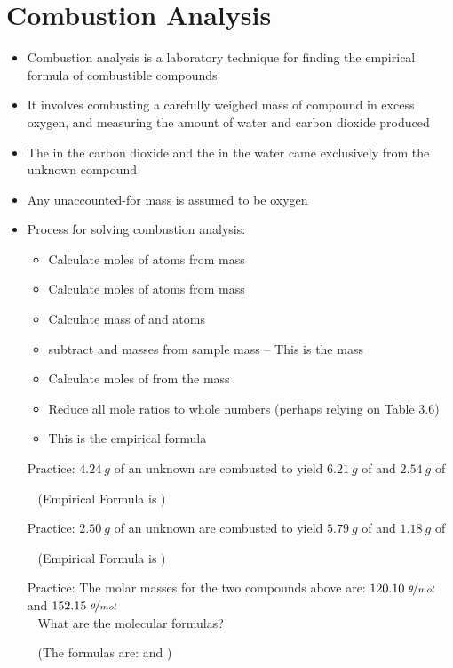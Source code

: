 \documentclass[12pt, openany, letterpaper]{memoir}
\begin{document}
\section{Combustion Analysis}
\begin{itemize}
	\item Combustion analysis is a laboratory technique for finding the empirical formula of combustible compounds
	\item It involves combusting a carefully weighed mass of compound in excess oxygen, and measuring the amount of water and carbon dioxide produced
	\item The  in the carbon dioxide and the  in the water came exclusively from the unknown compound
	\item Any unaccounted-for mass is assumed to be oxygen
	\item Process for solving combustion analysis:
	      \begin{itemize}
		      \item Calculate moles of  atoms from  mass
		      \item Calculate moles of  atoms from  mass
		      \item Calculate mass of  and  atoms
		      \item subtract  and  masses from sample mass -- This is the  mass
		      \item Calculate moles of  from the  mass
		      \item Reduce all mole ratios to whole numbers (perhaps relying on Table 3.6)
		      \item This is the empirical formula
	      \end{itemize}

	      Practice: $4.24~g$ of an unknown are combusted to yield $6.21~g$ of  and $2.54~g$ of 

	      ~\hphantom{Practice:} (Empirical Formula is )

	      Practice: $2.50~g$ of an unknown are combusted to yield $5.79~g$ of  and $1.18~g$ of 

	      ~\hphantom{Practice:} (Empirical Formula is )

	      Practice: The molar masses for the two compounds above are: $120.10~\nicefrac{g}{mol}$ and $152.15~\nicefrac{g}{mol}$\\
	      ~\hphantom{Practice: } What are the molecular formulas?

	      ~\hphantom{Practice:} (The formulas are:  and )
\end{itemize}
\end{document}
